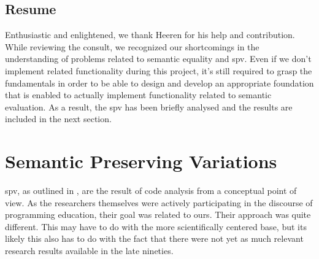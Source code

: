 \subsection{Resume}
Enthusiastic and enlightened, we thank Heeren for his help and contribution.
While reviewing the consult, we recognized our shortcomings in the understanding
of problems related to semantic equality and \gls{spv}. Even if we 
don't implement related functionality during this project, it's still required
to grasp the fundamentals in order to be able to design and develop an 
appropriate foundation that is enabled to actually implement functionality 
related to semantic evaluation. As a result, the \gls{spv} has been briefly
analysed and the results are included in the next section.

\section{Semantic Preserving Variations}
\gls{spv}, as outlined in \citep{xu2003transformation}, are the result of code
analysis from a conceptual point of view. As the researchers themselves were
actively participating in the discourse of programming education, their goal
was related to ours. Their approach was quite different. This may have to do
with the more scientifically centered base, but its likely this also has to do
with the fact that there were not yet as much relevant research results 
available in the late nineties. 

